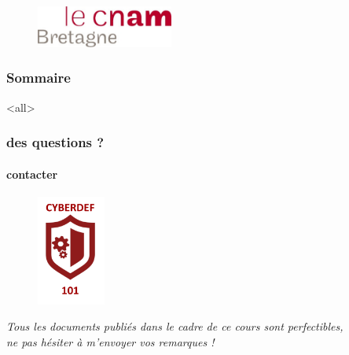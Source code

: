 \institute[\uinstituteshort]{\uinstitute \\ \uchaire}


\date[\uversion]{Date de publication\\ \today}





\begin{frame}[plain]
 					\begin{figure}
  					 \centering
   						 \includegraphics[width=0.4\textwidth]{../Tex/template.inc/Commons/CommonsPictures/cnambretagne.pdf}\\
				  \end{figure}
				  				\titlepage
\end{frame}


\begin{frame}
 \frametitle{Sommaire}
      \begin{multicols}{2}
         \tableofcontents[hideallsubsections]
     \end{multicols}
 \end{frame}
 


\mode<all>{\ubody}


\begin{frame}
 \frametitle{des questions ?}
  \framesubtitle{contacter \umaila}
  					\begin{figure}
  					 \centering
   						 \includegraphics[width=0.2\textwidth]{../Tex/template.inc/Commons/CommonsPictures/cyberdef101.pdf}\\
				  \end{figure}
				 	 \centering \textit{Tous les documents publiés dans le cadre de ce cours sont perfectibles, \\ne pas hésiter à m'envoyer vos remarques !}
 \end{frame}

